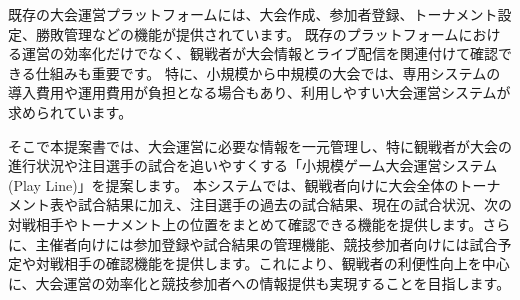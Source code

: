 既存の大会運営プラットフォームには、大会作成、参加者登録、トーナメント設定、勝敗管理などの機能が提供されています。
既存のプラットフォームにおける運営の効率化だけでなく、観戦者が大会情報とライブ配信を関連付けて確認できる仕組みも重要です。
特に、小規模から中規模の大会では、専用システムの導入費用や運用費用が負担となる場合もあり、利用しやすい大会運営システムが求められています。

そこで本提案書では、大会運営に必要な情報を一元管理し、特に観戦者が大会の進行状況や注目選手の試合を追いやすくする「小規模ゲーム大会運営システム(Play Line)」を提案します。
本システムでは、観戦者向けに大会全体のトーナメント表や試合結果に加え、注目選手の過去の試合結果、現在の試合状況、次の対戦相手やトーナメント上の位置をまとめて確認できる機能を提供します。さらに、主催者向けには参加登録や試合結果の管理機能、競技参加者向けには試合予定や対戦相手の確認機能を提供します。これにより、観戦者の利便性向上を中心に、大会運営の効率化と競技参加者への情報提供も実現することを目指します。